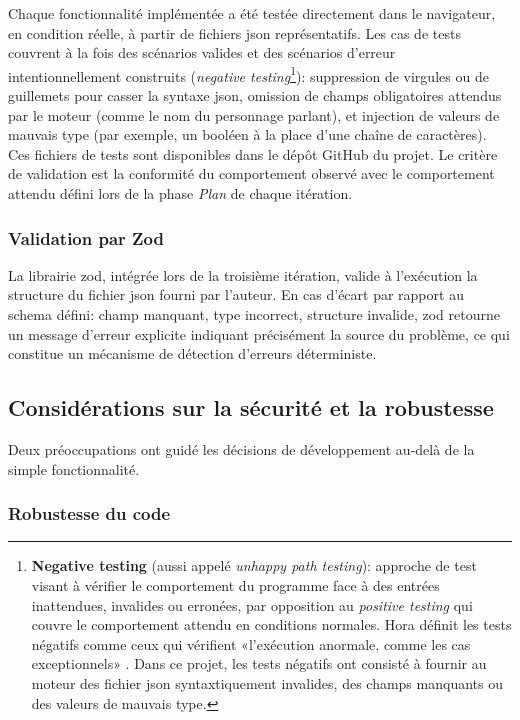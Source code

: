 Chaque fonctionnalité implémentée a été testée directement dans le navigateur, en condition réelle, à partir de fichiers \gls{json} représentatifs. Les cas de tests couvrent  à la fois des scénarios valides et des scénarios d'erreur intentionnellement construits (\textit{negative testing}\footnote{\textbf{Negative testing} (aussi appelé \textit{unhappy path testing}): approche de test visant à vérifier le comportement du programme face à des entrées inattendues, invalides ou erronées, par opposition au \textit{positive testing} qui couvre le comportement attendu en conditions normales. Hora définit les tests négatifs comme ceux qui vérifient «l'exécution anormale, comme les cas exceptionnels» \parencite{hora_test_2024}. Dans ce projet, les tests négatifs ont consisté à fournir au moteur des fichier \gls{json} syntaxtiquement invalides, des champs manquants ou des valeurs de mauvais type.}): suppression de virgules ou de guillemets pour casser la \gls{syntaxe} \gls{json}, omission de champs obligatoires attendus par le moteur (comme le nom du personnage parlant), et injection de valeurs de mauvais type (par exemple, un booléen à la place d'une chaîne de caractères). Ces fichiers de tests sont disponibles dans le dépôt GitHub du projet. Le critère de validation est la conformité du comportement observé avec le comportement attendu défini lors de la phase \textit{Plan} de chaque itération.


\subsubsection{Validation par Zod} \label{sec:zod}

La \gls{librairie} \gls{zod}, intégrée lors de la troisième itération, valide à l'exécution la structure du fichier \gls{json} fourni par l'auteur. En cas d'écart par rapport au \gls{schema} défini: champ manquant, type incorrect, structure invalide, \gls{zod} retourne un message d'erreur explicite indiquant précisément la source du problème, ce qui constitue un mécanisme de détection d'erreurs déterministe.


\subsection{Considérations sur la sécurité et la robustesse}

Deux préoccupations ont guidé les décisions de développement au-delà de la simple fonctionnalité.


\subsubsection{Robustesse du code}

